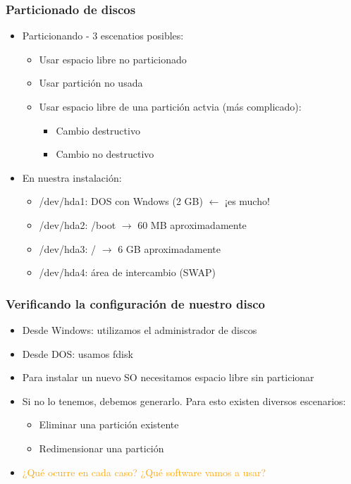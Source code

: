 \begin{frame}
	\frametitle{Particionado de discos}
	\begin{itemize}
		\item Particionando - 3 escenatios posibles:
		\begin{itemize}
			\item Usar espacio libre no particionado
			\item Usar partición no usada
			\item Usar espacio libre de una partición actvia (más complicado):
			\begin{itemize}
				\item Cambio destructivo
				\item Cambio no destructivo
			\end{itemize}
		\end{itemize}
		\item En nuestra instalación:
		\begin{itemize}
			\item /dev/hda1: DOS con Wndows (2 GB) $\leftarrow$ ¡es mucho!
			\item /dev/hda2: /boot $\rightarrow$ 60 MB aproximadamente
			\item /dev/hda3: / $\rightarrow$ 6 GB aproximadamente
			\item /dev/hda4: área de intercambio (SWAP)
		\end{itemize}
	\end{itemize}
\end{frame}

\begin{frame}
	\frametitle{Verificando la configuración de nuestro disco}
	\begin{itemize}
		\item Desde Windows: utilizamos el administrador de discos
		\item Desde DOS: usamos fdisk
		\item Para instalar un nuevo SO necesitamos espacio libre sin particionar
		\item Si no lo tenemos, debemos generarlo. Para esto existen diversos escenarios:
		\begin{itemize}
			\item Eliminar una partición existente
			\item Redimensionar una partición
		\end{itemize}
		\item \textcolor{orange}{¿Qué ocurre en cada caso? ¿Qué software vamos a usar?}
	\end{itemize}
\end{frame}

